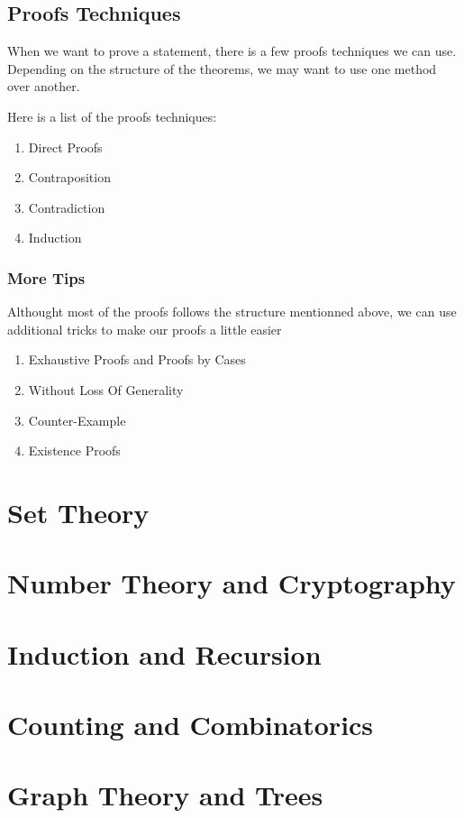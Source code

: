\documentclass{article}
\begin{document}
\subsection{Proofs Techniques}

When we want to prove a statement, there is a few proofs techniques we can use.
Depending on the structure of the theorems, we may want to use one method over
another.

Here is a list of the proofs techniques:

    \begin{enumerate}
	\item Direct Proofs
	\item Contraposition
	\item Contradiction
	\item Induction
    \end{enumerate}

\subsubsection{More Tips}

Althought most of the proofs follows the structure mentionned above, we can use
additional tricks to make our proofs a little easier

    \begin{enumerate}
	\item Exhaustive Proofs and Proofs by Cases
	\item Without Loss Of Generality
	\item Counter-Example
	\item Existence Proofs
    \end{enumerate}


\section{Set Theory}




\section{Number Theory and Cryptography}

\section{Induction and Recursion}

\section{Counting and Combinatorics}

\section{Graph Theory and Trees}
\end{document}
